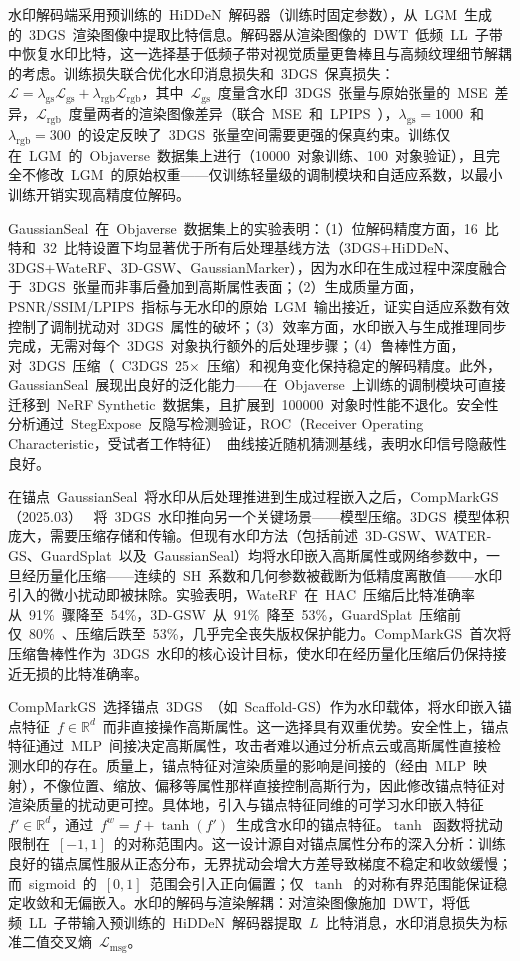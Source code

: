 水印解码端采用预训练的~HiDDeN~解码器（训练时固定参数），从~LGM~生成的~3DGS~渲染图像中提取比特信息。解码器从渲染图像的~DWT~低频~LL~子带中恢复水印比特，这一选择基于低频子带对视觉质量更鲁棒且与高频纹理细节解耦的考虑。训练损失联合优化水印消息损失和~3DGS~保真损失：$\mathcal{L} = \lambda_{\text{gs}} \mathcal{L}_{\text{gs}} + \lambda_{\text{rgb}} \mathcal{L}_{\text{rgb}}$，其中~$\mathcal{L}_{\text{gs}}$~度量含水印~3DGS~张量与原始张量的~MSE~差异，$\mathcal{L}_{\text{rgb}}$~度量两者的渲染图像差异（联合~MSE~和~LPIPS~），$\lambda_{\text{gs}}=1000$~和~$\lambda_{\text{rgb}}=300$~的设定反映了~3DGS~张量空间需要更强的保真约束。训练仅在~LGM~的~Objaverse~数据集上进行（10000~对象训练、100~对象验证），且完全不修改~LGM~的原始权重——仅训练轻量级的调制模块和自适应系数，以最小训练开销实现高精度位解码。

GaussianSeal~在~Objaverse~数据集上的实验表明：（1）位解码精度方面，16~比特和~32~比特设置下均显著优于所有后处理基线方法（3DGS+HiDDeN、3DGS+WateRF、3D-GSW、GaussianMarker），因为水印在生成过程中深度融合于~3DGS~张量而非事后叠加到高斯属性表面；（2）生成质量方面，PSNR/SSIM/LPIPS~指标与无水印的原始~LGM~输出接近，证实自适应系数有效控制了调制扰动对~3DGS~属性的破坏；（3）效率方面，水印嵌入与生成推理同步完成，无需对每个~3DGS~对象执行额外的后处理步骤；（4）鲁棒性方面，对~3DGS~压缩（~C3DGS~25$\times$~压缩）和视角变化保持稳定的解码精度。此外，GaussianSeal~展现出良好的泛化能力——在~Objaverse~上训练的调制模块可直接迁移到~NeRF Synthetic~数据集，且扩展到~100000~对象时性能不退化。安全性分析通过~StegExpose~反隐写检测验证，ROC（Receiver Operating Characteristic，受试者工作特征）~曲线接近随机猜测基线，表明水印信号隐蔽性良好。

在锚点~GaussianSeal~将水印从后处理推进到生成过程嵌入之后，CompMarkGS（2025.03）~\cite{2503_12836} 将~3DGS~水印推向另一个关键场景——模型压缩。3DGS~模型体积庞大，需要压缩存储和传输。但现有水印方法（包括前述~3D-GSW、WATER-GS、GuardSplat~以及~GaussianSeal）均将水印嵌入高斯属性或网络参数中，一旦经历量化压缩——连续的~SH~系数和几何参数被截断为低精度离散值——水印引入的微小扰动即被抹除。实验表明，WateRF~在~HAC~压缩后比特准确率从~91\%~骤降至~54\%，3D-GSW~从~91\%~降至~53\%，GuardSplat~压缩前仅~80\%~、压缩后跌至~53\%，几乎完全丧失版权保护能力。CompMarkGS~首次将压缩鲁棒性作为~3DGS~水印的核心设计目标，使水印在经历量化压缩后仍保持接近无损的比特准确率。

CompMarkGS~选择锚点~3DGS~（如~Scaffold-GS）作为水印载体，将水印嵌入锚点特征~$f \in \mathbb{R}^d$~而非直接操作高斯属性。这一选择具有双重优势。安全性上，锚点特征通过~MLP~间接决定高斯属性，攻击者难以通过分析点云或高斯属性直接检测水印的存在。质量上，锚点特征对渲染质量的影响是间接的（经由~MLP~映射），不像位置、缩放、偏移等属性那样直接控制高斯行为，因此修改锚点特征对渲染质量的扰动更可控。具体地，引入与锚点特征同维的可学习水印嵌入特征~$f' \in \mathbb{R}^d$，通过~$f^w = f + \tanh(f')$~生成含水印的锚点特征。$\tanh$~函数将扰动限制在~$[-1, 1]$~的对称范围内。这一设计源自对锚点属性分布的深入分析：训练良好的锚点属性服从正态分布，无界扰动会增大方差导致梯度不稳定和收敛缓慢；而~sigmoid~的~$[0, 1]$~范围会引入正向偏置；仅~$\tanh$~的对称有界范围能保证稳定收敛和无偏嵌入。水印的解码与渲染解耦：对渲染图像施加~DWT，将低频~LL~子带输入预训练的~HiDDeN~解码器提取~$L$~比特消息，水印消息损失为标准二值交叉熵~$\mathcal{L}_{\mathrm{msg}}$。

